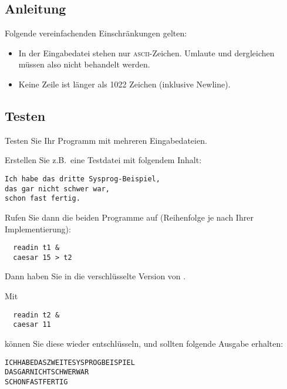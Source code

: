 \subsection*{Anleitung}

Folgende vereinfachenden Einschränkungen gelten:

\begin{itemize}
\item In der Eingabedatei stehen nur \textsc{ascii}-Zeichen. Umlaute und
dergleichen müssen also nicht behandelt werden.
\item Keine Zeile ist länger als 1022 Zeichen (inklusive Newline).
\end{itemize}

\subsection*{Testen}

Testen Sie Ihr Programm mit mehreren Eingabedateien.

Erstellen Sie z.B.\ eine Testdatei  mit folgendem Inhalt:
\begin{verbatim}
Ich habe das dritte Sysprog-Beispiel,
das gar nicht schwer war,
schon fast fertig.
\end{verbatim}
Rufen Sie dann die beiden Programme auf (Reihenfolge je nach Ihrer
Implementierung):
\begin{verbatim}
  readin t1 &
  caesar 15 > t2
\end{verbatim}
Dann haben Sie in  die verschlüsselte Version von
.

Mit
\begin{verbatim}
  readin t2 &
  caesar 11
\end{verbatim}
können Sie diese wieder entschlüsseln, und sollten folgende Ausgabe
erhalten:
\begin{verbatim}
ICHHABEDASZWEITESYSPROGBEISPIEL
DASGARNICHTSCHWERWAR
SCHONFASTFERTIG
\end{verbatim}

\osueguidelinesthree


